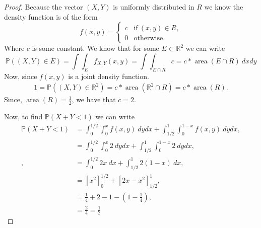 \documentclass{article}
\newcommand{\R}{\mathbb{R}}
\renewcommand{\P}[1]{\mathbb{P}(#1)}
\DeclareMathOperator{\area}{area}
\begin{document}
\begin{proof}
    Because the vector $(X,Y)$ is uniformly distributed in $R$ we know
    the density function is of the form
    \begin{equation*}
        f(x,y) = \begin{cases}
            c & \text{if} \ (x,y) \in R, \\
            0 & \text{otherwise}.
        \end{cases}
    \end{equation*}
    Where $c$ is some constant. We know that for some $E\subset \R^2$ we can
    write
    \begin{equation*}
        \P{(X,Y) \in E} = \int\int_{E} f_{X,Y}(x,y)
        = \int\int_{E\cap R} c = c*\area(E\cap R)\ dxdy
    \end{equation*}
    Now, since $f(x,y)$ is a joint density function.
    \begin{align*}
        1 = \P{(X,Y) \in \R^2} = c*\area(\R^2 \cap R) = c*\area(R).
    \end{align*}
    Since, $\area(R) = \frac{1}{2}$, we have that $c = 2$.

    Now, to find $\P{X+Y < 1}$ we can write
    \begin{align*}
        \P{X + Y < 1} & = \int_0^{1/2}\int_0^x f(x,y) \ dydx
        + \int_{1/2}^{1}\int_0^{1-x} f(x,y) \ dydx,              \\
                      & = \int_0^{1/2}\int_0^x 2 \ dydx
        +\int_{1/2}^{1}\int_0^{1-x} 2 \ dydx,                    \\ ,
                      & = \int_0^{1/2} 2x \ dx
        + \int_{1/2}^1 2(1-x) \ dx,                              \\
                      & = \left[x^2 \right]_0^{1/2}
        + \left[2x - x^2 \right]_{1/2}^1,                        \\
                      & = \frac{1}{4} + 2 - 1 - (1-\frac{1}{4}), \\
                      & = \frac{2}{4} = \frac{1}{2}
    \end{align*}


\end{proof}
\end{document}
